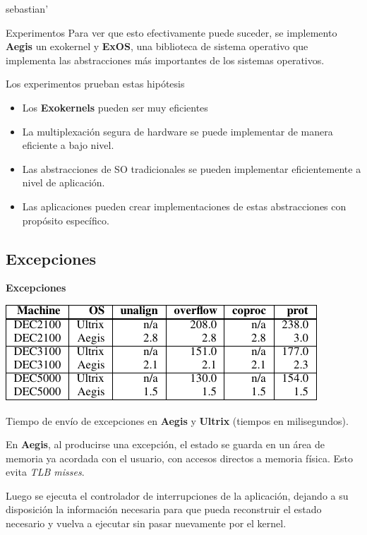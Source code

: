 sebastian'\]\documentclass[10pt]{beamer}
\begin{document}
\begin{frame}{Experimentos}
Para ver que esto efectivamente puede suceder, se implemento \textbf{Aegis} un exokernel y \textbf{ExOS}, una biblioteca de sistema operativo que implementa las abstracciones más importantes de los sistemas operativos. 

Los experimentos prueban estas hipótesis

\begin{itemize}
  \item Los \textbf{Exokernels} pueden ser muy eficientes
  \item La multiplexación segura de hardware se puede implementar de manera eficiente a bajo nivel.
  \item Las abstracciones de SO tradicionales se pueden implementar eficientemente a nivel de aplicación.
  \item Las aplicaciones pueden crear implementaciones de estas abstracciones con propósito específico.
\end{itemize}
\end{frame}

\subsection{Excepciones}

\begin{frame}
\textbf{Excepciones}\\[2em]
\begin{table}
\includegraphics[scale=0.8]{grafico-excepciones.pdf}
\caption{Tiempo de envío de excepciones en \textbf{Aegis} y \textbf{Ultrix} (tiempos en milisegundos).}
\end{table}

En \textbf{Aegis}, al producirse una excepción, el estado se guarda en un área de memoria ya acordada con el usuario, con accesos directos a memoria física. Esto evita \emph{TLB misses}.

Luego se ejecuta el controlador de interrupciones de la aplicación, dejando a su disposición la información necesaria para que pueda reconstruir el estado necesario y vuelva a ejecutar sin pasar nuevamente por el kernel. 
\end{frame}
\end{document}
